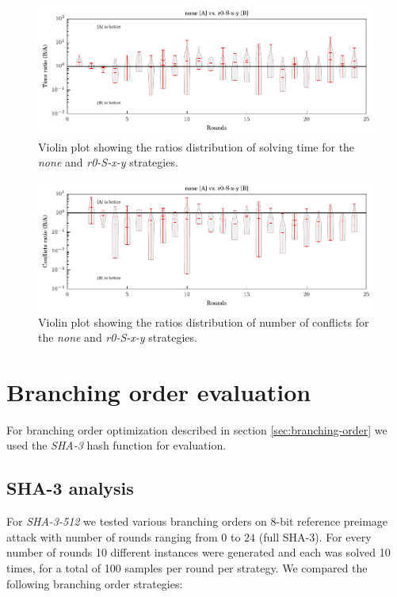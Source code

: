\begin{figure}
\centering \includegraphics{figures/bo-ex1/ratio-time-none-r0sxy.pdf}
\caption{Violin plot showing the ratios distribution of solving time for the \emph{none} and \emph{r0-S-x-y} strategies.}
\label{fig:bo-ratio-time-none-r0sxy}
\end{figure}

\begin{figure}
\centering \includegraphics{figures/bo-ex1/ratio-confl-none-r0sxy.pdf}
\caption{Violin plot showing the ratios distribution of number of conflicts for the \emph{none} and \emph{r0-S-x-y} strategies.}
\label{fig:bo-ratio-confl-none-r0sxy}
\end{figure}

\section{Branching order evaluation}
For branching order optimization described in section \ref{sec:branching-order} we used the \emph{SHA-3} hash function for evaluation.

\subsection{SHA-3 analysis}
For \emph{SHA-3-512} we tested various branching orders on $8$-bit reference preimage attack with number of rounds ranging from $0$ to $24$ (full SHA-3).
For every number of rounds 10 different instances were generated and each was solved 10 times, for a total of 100 samples per round per strategy.
We compared the following branching order strategies:

